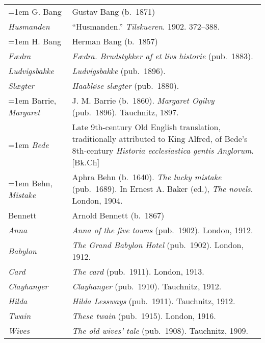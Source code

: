 \begin{xltabular}{\textwidth}{ lQ }
\hangindent=1em  G. Bang & Gustav Bang (b.~1871)\\
\hspace{1em}\textit{Husmanden} & ``Husmanden.'' \textit{Tilskueren}. 1902. 372--388. \\

\hangindent=1em  H. Bang & Herman Bang (b.~1857)\\
\hspace{1em}\textit{Fædra} & \textit{Fædra. Brudstykker af et livs historie} (pub.~1883). \\
\hspace{1em}\textit{Ludvigs\-bakke} & \textit{Ludvigsbakke} (pub.~1896). \\
\hspace{1em}\textit{Slægter} & \textit{Haabløse slægter} (pub.~1880). \\

\hangindent=1em  Barrie, \textit{Margaret} & J. M. Barrie (b.~1860). \textit{Margaret Ogilvy} (pub.~1896). Tauchnitz, 1897. \\

\hangindent=1em  \textit{Bede} & Late 9th-century Old English translation, traditionally attributed to King Alfred, of Bede's 8th-century \textit{Historia ecclesiastica gentis Anglorum}. [Bk.Ch] \\

\hangindent=1em  Behn, \textit{Mistake} & Aphra Behn (b.~1640). \textit{The lucky mistake} (pub.~1689). In Ernest A. Baker (ed.), \textit{The novels}. London, 1904. \\

Bennett & Arnold Bennett (b.~1867) \\
\hspace{1em}\textit{Anna} & \textit{Anna of the five towns} (pub.~1902). London, 1912. \\
\hspace{1em}\textit{Babylon} & \textit{The Grand Babylon Hotel} (pub.~1902). London, 1912. \\ %
\hspace{1em}\textit{Card} & \textit{The card} (pub.~1911). London, 1913. \\
\hspace{1em}\textit{Clayhanger} & \textit{Clayhanger} (pub.~1910). Tauchnitz, 1912. \\
\hspace{1em}\textit{Hilda} & \textit{Hilda Lessways} (pub.~1911). Tauchnitz, 1912. \\
\hspace{1em}\textit{Twain} & \textit{These twain} (pub.~1915). London, 1916. \\
\hspace{1em}\textit{Wives} & \textit{The old wives' tale} (pub.~1908). Tauchnitz, 1909. \\


\end{xltabular}
